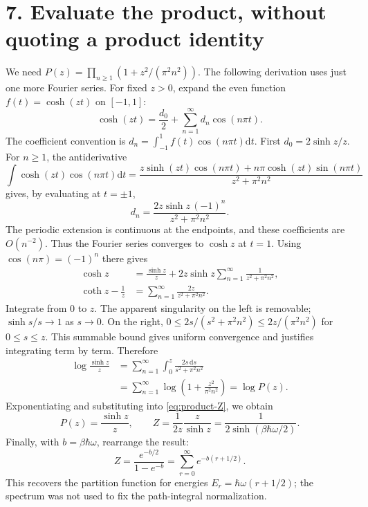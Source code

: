 \documentclass[11pt,letterpaper]{article}
\newcommand{\dd}{\mathrm{d}}
\begin{document}
\newpage
\section*{7. Evaluate the product, without quoting a product identity}
We need $P(z)=\prod_{n\geq1}(1+z^2/(\pi^2n^2))$.
The following derivation uses just one more Fourier series.
For fixed $z>0$, expand the even function $f(t)=\cosh(zt)$ on $[-1,1]$:
\[
 \cosh(zt)=\frac{d_0}{2}+\sum_{n=1}^{\infty}d_n\cos(n\pi t).
\]
The coefficient convention is $d_n=\int_{-1}^{1}f(t)\cos(n\pi t)\dd t$.
First $d_0=2\sinh z/z$. For $n\geq1$, the antiderivative
\[
 \int\cosh(zt)\cos(n\pi t)\dd t
 =\frac{z\sinh(zt)\cos(n\pi t)+n\pi\cosh(zt)\sin(n\pi t)}
        {z^2+\pi^2n^2}
\]
gives, by evaluating at $t=\pm1$,
\[
 d_n=\frac{2z\sinh z\,(-1)^n}{z^2+\pi^2n^2}.
\]
The periodic extension is continuous at the endpoints, and these coefficients
are $O(n^{-2})$. Thus the Fourier series converges to $\cosh z$ at $t=1$.
Using $\cos(n\pi)=(-1)^n$ there gives
\begin{align}
 \cosh z&=\frac{\sinh z}{z}
       +2z\sinh z\sum_{n=1}^{\infty}\frac{1}{z^2+\pi^2n^2},\\
 \coth z-\frac1z&=\sum_{n=1}^{\infty}\frac{2z}{z^2+\pi^2n^2}.
 \label{eq:coth}
\end{align}
Integrate from $0$ to $z$. The apparent singularity on the left is removable;
$\sinh s/s\to1$ as $s\to0$. On the right,
$0\leq 2s/(s^2+\pi^2n^2)\leq 2z/(\pi^2n^2)$ for $0\leq s\leq z$.
This summable bound gives uniform convergence and justifies integrating term
by term. Therefore
\begin{align}
 \log\frac{\sinh z}{z}
 &=\sum_{n=1}^{\infty}\int_0^z\frac{2s\,\dd s}{s^2+\pi^2n^2}\\
 &=\sum_{n=1}^{\infty}\log\left(1+\frac{z^2}{\pi^2n^2}\right)
 =\log P(z).
\end{align}
Exponentiating and substituting into \eqref{eq:product-Z}, we obtain
\begin{equation}
 P(z)=\frac{\sinh z}{z},\qquad
 \boxed{Z=\frac{1}{2z}\frac{z}{\sinh z}
       =\frac{1}{2\sinh(\beta\hbar\omega/2)}}.
\end{equation}
Finally, with $b=\beta\hbar\omega$, rearrange the result:
\[
 Z=\frac{e^{-b/2}}{1-e^{-b}}
 =\sum_{r=0}^{\infty}e^{-b(r+1/2)}.
\]
This recovers the partition function for energies $E_r=\hbar\omega(r+1/2)$;
the spectrum was not used to fix the path-integral normalization.

\newpage
\end{document}
